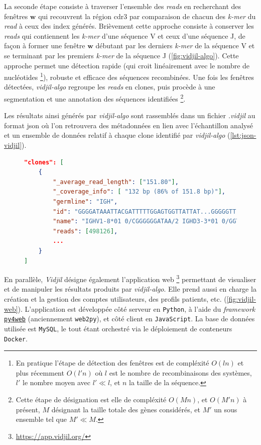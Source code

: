 

La seconde étape consiste à traverser l'ensemble des \textit{reads} en
recherchant des fenêtres $\mathbf{w}$ qui recouvrent la région \gls{cdr}3 par
comparaison de chacun des \textit{k-mer} du \textit{read} à ceux des index
générés. Brièvement cette approche consiste à conserver les \textit{reads} qui
contiennent les \textit{k-mer} d'une séquence V et ceux d'une séquence J, de
façon à former une fenêtre $\mathbf{w}$ débutant par les derniers
\textit{k-mer} de la séquence V et se terminant par les premiers \textit{k-mer}
de la séquence J (\autoref{fig:vidjil-algo}). Cette approche permet une
détection rapide (qui croit linéairement avec le nombre de nucléotides
\footnote{En pratique l'étape de détection des fenêtres est de compléxité
$O(ln)$ et plus récemment $O(l'n)$ où $l$ est le nombre de recombinaisons des
systèmes, $l'$ le nombre moyen avec $l' \ll l$, et $n$ la taille de la
séquence.}), robuste et efficace des séquences recombinées. Une fois les
fenêtres détectées, \textit{vidjil-algo} regroupe les \textit{reads} en clones,
puis procède à une segmentation et une annotation des séquences identifiées
\footnote{Cette étape de désignation est elle de compléxité $O(Mn)$, et
$O(M'n)$ à présent, $M$ désignant la taille totale des gènes considérés, et
$M'$ un sous ensemble tel que $M' \ll M$.}.


Les résultats ainsi générés par \textit{vidjil-algo} sont rassemblés dans un
fichier \textit{.vidjil} au format \gls{json} où l'on retrouvera des
métadonnées en lien avec l'échantillon analysé et un ensemble de données
relatif à chaque clone identifié par \textit{vidjil-algo}
(\autoref{lst:json-vidjil}).

\begin{figure}[H]
    \begin{lstlisting}[language=json, 
caption={Extrait d'une sortie de \textit{vidjil-algo}.},
label={lst:json-vidjil}]
"clones": [
    {
        "_average_read_length": ["151.80"],
        "_coverage_info": [ "132 bp (86% of 151.8 bp)"],
        "germline": "IGH",
        "id": "GGGGATAAATTACGATTTTTGGAGTGGTTATTAT...GGGGGTT",
        "name": "IGHV1-8*01 0/CGGGGGGATAA/2 IGHD3-3*01 0/GGTATGGGGGGTTTTAG/7 IGHJ4*02",
        "reads": [498126],
        ...
    }
]
\end{lstlisting}
\end{figure}

En parallèle, \textit{Vidjil} désigne également l'application web
\footnote{\url{https://app.vidjil.org/}} permettant de visualiser et de
manipuler les résultats produits par \textit{vidjil-algo}. Elle prend aussi en
charge la création et la gestion des comptes utilisateurs, des profils
patients, etc. (\autoref{fig:vidjil-web}). L'application est développée côté
serveur en \texttt{Python}, à l'aide du \textit{framework}
\href{https://py4web.com}{\texttt{py4web}} (anciennement \texttt{web2py}), et
côté client en \texttt{JavaScript}. La base de données utilisée est
\texttt{MySQL}, le tout étant orchestré via le déploiement de conteneurs
\texttt{Docker}.

